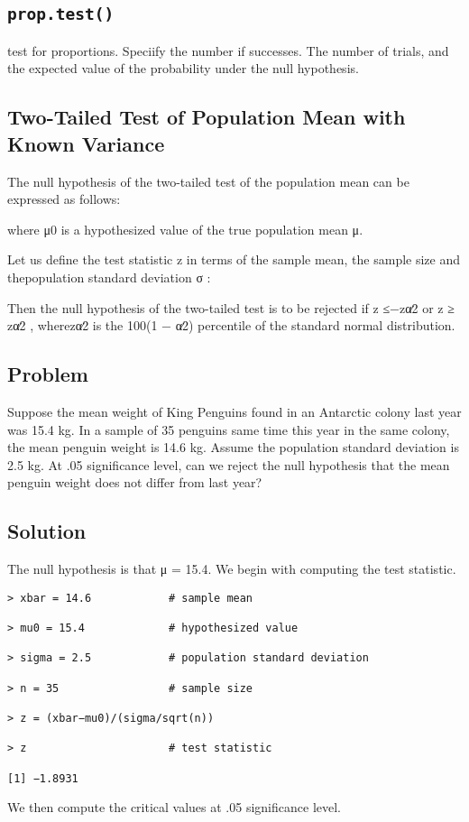 \subsection{ \texttt{prop.test()} }


test for proportions. Speciify the number if successes.  The number of trials, and the expected value of the probability under the null hypothesis.

\subsection{Two-Tailed Test of Population Mean with Known Variance}

The null hypothesis of the two-tailed test of the population mean can be expressed as follows:



where μ0 is a hypothesized value of the true population mean μ.

Let us define the test statistic z in terms of the sample mean, the sample size and thepopulation standard deviation σ :



Then the null hypothesis of the two-tailed test is to be rejected if z ≤−zα∕2 or z ≥ zα∕2 , wherezα∕2 is the 100(1 − α∕2) percentile of the standard normal distribution.

\subsection{Problem}

Suppose the mean weight of King Penguins found in an Antarctic colony last year was 15.4 kg. In a sample of 35 penguins same time this year in the same colony, the mean penguin weight is 14.6 kg. Assume the population standard deviation is 2.5 kg. At .05 significance level, can we reject the null hypothesis that the mean penguin weight does not differ from last year?

\subsection{Solution}

The null hypothesis is that μ = 15.4. We begin with computing the test statistic.

\begin{framed}
\begin{verbatim}
> xbar = 14.6            # sample mean 

> mu0 = 15.4             # hypothesized value 

> sigma = 2.5            # population standard deviation 

> n = 35                 # sample size 

> z = (xbar−mu0)/(sigma/sqrt(n)) 

> z                      # test statistic 

[1] −1.8931
\end{verbatim}
\end{framed}
We then compute the critical values at .05 significance level.

